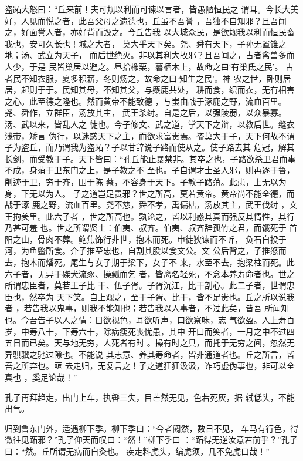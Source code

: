 \documentclass[12pt,UTF8]{ctexbook}
\begin{document}
盗跖大怒曰：“丘来前！夫可规以利而可谏以言者，皆愚陋恒民之 谓耳。今长大美好，人见而悦之者，此吾父母之遗德也，丘虽不吾誉 ，吾独不自知邪？且吾闻之，好面誉人者，亦好背而毁之。今丘告我 以大城众民，是欲规我以利而恒民畜我也，安可久长也！城之大者， 莫大乎天下矣。尧、舜有天下，子孙无置锥之地；汤、武立为天子， 而后世绝灭。非以其利大故邪？且吾闻之，古者禽兽多而人少，于是 民皆巢居以避之。昼拾橡栗，暮栖木上，故命之曰‘有巢氏之民’。 古者民不知衣服，夏多积薪，冬则炀之，故命之曰‘知生之民’。神 农之世，卧则居居，起则于于。民知其母，不知其父，与麋鹿共处， 耕而食，织而衣，无有相害之心。此至德之隆也。然而黄帝不能致德 ，与蚩由战于涿鹿之野，流血百里。尧、舜作，立群臣，汤放其主， 武王杀纣。自是之后，以强陵弱，以众暴寡。汤、武以来，皆乱人之 徒也。今子修文、武之道，掌天下之辩，以教后世。缝衣浅带，矫言 伪行，以迷惑天下之主，而欲求富贵焉。盗莫大于子，天下何故不谓 子为盗丘，而乃谓我为盗跖？子以甘辞说子路而使从之。使子路去其 危冠，解其长剑，而受教于子。天下皆曰：“孔丘能止暴禁非。其卒之也，子路欲杀卫君而事不成，身菹于卫东门之上，是子教之不 至也。子自谓才士圣人邪，则再逐于鲁，削迹于卫，穷于齐，围于陈 蔡，不容身于天下。子教子路菹。此患，上无以为身，下无以为人。 子之道岂足贵邪？世之所高，莫若黄帝。黄帝尚不能全德，而战于涿 鹿之野，流血百里。尧不慈，舜不孝，禹偏枯，汤放其主，武王伐纣 ，文王拘羑里。此六子者 ，世之所高也。孰论之，皆以利惑其真而强反其情性，其行乃甚可羞 也。世之所谓贤士：伯夷、叔齐。伯夷、叔齐辞孤竹之君，而饿死于 首阳之山，骨肉不葬。鲍焦饰行非世，抱木而死。申徒狄谏而不听， 负石自投于河，为鱼鳖所食。介子推至忠也，自割其股以食文公。文 公后背之，子推怒而去，抱木而燔死。尾生与女子期于梁下，女子不 来，水至不去，抱梁柱而死。此六子者，无异于磔犬流豕、操瓢而乞 者，皆离名轻死，不念本养寿命者也。世之所谓忠臣者，莫若王子比 干、伍子胥。子胥沉江，比干剖心。此二子者，世谓忠臣也，然卒为 天下笑。自上观之，至于子胥、比干，皆不足贵也。丘之所以说我者 ，若告我以鬼事，则我不能知也；若告我以人事者，不过此矣，皆吾 所闻知也。今吾告子以人之情：目欲视色，耳欲听声，口欲察味，志 气欲盈。人上寿百岁，中寿八十，下寿六十，除病瘦死丧忧患，其中 开口而笑者，一月之中不过四五日而已矣。天与地无穷，人死者有时 。操有时之具，而托于无穷之间，忽然无异骐骥之驰过隙也。不能说 其志意、养其寿命者，皆非通道者也。丘之所言，皆吾之所弃也。亟 去走归，无复言之！子之道狂狂汲汲，诈巧虚伪事也，非可以全真也 ，奚足论哉！”

孔子再拜趋走，出门上车，执辔三失，目芒然无见，色若死灰，据 轼低头，不能出气。

归到鲁东门外，适遇柳下季。柳下季曰：“今者阙然，数日不见， 车马有行色，得微往见跖邪？”孔子仰天而叹曰：“然！”柳下季曰 ：“跖得无逆汝意若前乎？”孔子曰：“然。丘所谓无病而自灸也。 疾走料虎头，编虎须，几不免虎口哉！”
\end{document}
